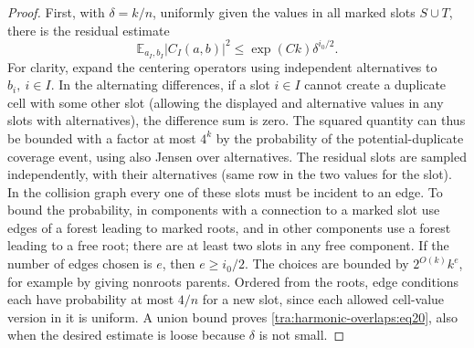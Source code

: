 \begin{proof}
First, with \(\delta=k/n\), uniformly given the values in all marked slots \(S\cup T\), there is the residual estimate
\begin{equation}
           \mathbb E_{a_I,b_I}|C_I(a,b)|^2
                              \le \exp(Ck)\delta^{i_0/2}.                 \label{tra:harmonic-overlaps:eq20}
\end{equation}
For clarity, expand the centering operators using independent alternatives to \(b_i,\ i\in I\). In the alternating differences, if a slot \(i\in I\) cannot create a duplicate cell with some other slot (allowing the displayed and alternative values in any slots with alternatives), the difference sum is zero. The squared quantity can thus be bounded with a factor at most \(4^k\) by the probability of the potential-duplicate coverage event, using also Jensen over alternatives. The residual slots are sampled independently, with their alternatives (same row in the two values for the slot). In the collision graph every one of these slots must be incident to an edge. To bound the probability, in components with a connection to a marked slot use edges of a forest leading to marked roots, and in other components use a forest leading to a free root; there are at least two slots in any free component. If the number of edges chosen is \(e\), then \(e\ge i_0/2\). The choices are bounded by \(2^{O(k)}k^e\), for example by giving nonroots parents. Ordered from the roots, edge conditions each have probability at most \(4/n\) for a new slot, since each allowed cell-value version in it is uniform. A union bound proves \eqref{tra:harmonic-overlaps:eq20}, also when the desired estimate is loose because \(\delta\) is not small.


\end{proof}
